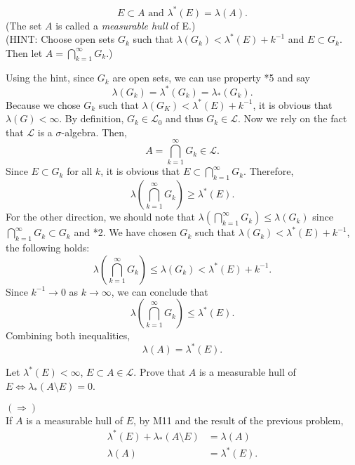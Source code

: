 \documentclass[answers]{exam}
\begin{document}
\begin{questions}
   $$
   E \subset A \text{ and } \lambda^{*}\left(E\right) = \lambda\left(A\right).
   $$
   (The set $A$ is called a \emph{measurable hull} of E.)\\
   (HINT: Choose open sets $G_{k}$ such that $\lambda\left(G_{k}\right) < \lambda^{*}\left(E\right)+k^{-1}$ and $E \subset G_{k}$. Then let $A = \bigcap_{k=1}^{\infty}G_{k}$.)
   \begin{solution}
   Using the hint, since $G_{k}$ are open sets, we can use property *5 and say
   $$
   \lambda\left(G_{k}\right) = \lambda^{*}\left(G_{k}\right) = \lambda_{*}\left(G_{k}\right).
   $$
   Because we chose $G_{k}$ such that $\lambda\left(G_{K}\right) < \lambda^{*}\left(E\right) + k^{-1}$, it is obvious that $\lambda\left(G\right) < \infty$. By definition, $G_{k} \in \mathcal{L}_{0}$ and thus $G_{k} \in \mathcal{L}$. Now we rely on the fact that $\mathcal{L}$ is a $\sigma$-algebra. Then,
   $$
   A = \bigcap_{k=1}^{\infty}G_{k} \in \mathcal{L}.
   $$
   Since $E \subset G_{k}$ for all $k$, it is obvious that $E \subset \bigcap_{k=1}^{\infty}G_{k}$. Therefore,
   $$
   \lambda\left(\bigcap_{k=1}^{\infty}G_{k}\right) \geq \lambda^{*}\left(E\right).
   $$
   For the other direction, we should note that $\lambda\left(\bigcap_{k=1}^{\infty}G_{k}\right) \leq \lambda\left(G_{k}\right)$ since $\bigcap_{k=1}^{\infty}G_{k} \subset G_{k}$ and *2. We have chosen $G_{k}$ such that $\lambda\left(G_{k}\right) < \lambda^{*}\left(E\right) +k^{-1}$, the following holds:
   $$
   \lambda\left(\bigcap_{k=1}^{\infty}G_{k}\right) \leq \lambda\left(G_{k}\right) < \lambda^{*}\left(E\right) + k^{-1}.
   $$
   Since $k^{-1} \to 0$ as $k \to \infty$, we can conclude that
   $$
   \lambda\left(\bigcap_{k=1}^{\infty}G_{k}\right) \leq \lambda^{*}\left(E\right).
   $$
   Combining both inequalities,
   $$
   \lambda\left(A\right) = \lambda^{*}\left(E\right).
   $$
   \end{solution}
   \question
   Let $\lambda^{*}\left(E\right) < \infty$, $E \subset A \in \mathcal{L}$. Prove that $A$ is a measurable hull of $E \iff \lambda_{*}\left(A\setminus E\right) = 0$.
   \begin{solution}
   $\left(\Rightarrow\right)$\\
   If $A$ is a measurable hull of $E$, by M11 and the result of the previous problem,
   \begin{align*}
   \lambda^{*}\left(E\right) + \lambda_{*}\left(A\setminus E\right) &= \lambda\left(A\right)\\
   \lambda\left(A\right) &= \lambda^{*}\left(E\right).
   \end{align*}

\end{solution}
\end{questions}
\end{document}
